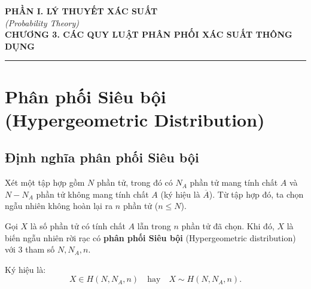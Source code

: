 \begin{center}
    {\large \textbf{PHẦN I. LÝ THUYẾT XÁC SUẤT}}\\[0.3em]
    {\normalsize \textit{(Probability Theory)}}\\[1em]
    {\LARGE \textbf{CHƯƠNG 3. CÁC QUY LUẬT PHÂN PHỐI XÁC SUẤT THÔNG DỤNG}}
\end{center}

\vspace{1em}
\hrule
\vspace{1.5em}

\section{Phân phối Siêu bội (Hypergeometric Distribution)}

\subsection{Định nghĩa phân phối Siêu bội}

\begin{dinhnghia}
Xét một tập hợp gồm $N$ phần tử, trong đó có $N_A$ phần tử mang tính chất $A$ và $N - N_A$ phần tử không mang tính chất $A$ (ký hiệu là $\overline{A}$). Từ tập hợp đó, ta chọn ngẫu nhiên không hoàn lại ra $n$ phần tử ($n \le N$).

Gọi $X$ là số phần tử có tính chất $A$ lẫn trong $n$ phần tử đã chọn. Khi đó, $X$ là biến ngẫu nhiên rời rạc có \textbf{phân phối Siêu bội} (Hypergeometric distribution) với 3 tham số $N, N_A, n$.

Ký hiệu là:
\[
X \in H(N, N_A, n) \quad \text{hay} \quad X \sim H(N, N_A, n).
\]
\end{dinhnghia}

\begin{center}
\end{center}

